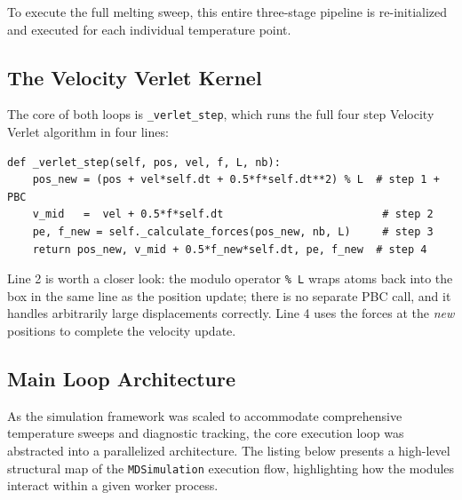 To execute the full melting sweep, this entire three-stage pipeline is re-initialized and executed for each individual temperature point.

\subsection{The Velocity Verlet Kernel}

The core of both loops is \texttt{\_verlet\_step}, which runs the full four step Velocity Verlet algorithm in four lines:

\begin{lstlisting}[caption={The integration kernel in \texttt{md\_engine.py}. All four lines implement Equations~\eqref{eq:vv_pos} to \eqref{eq:vv_vfull} directly. The \texttt{\% L} on line 2 applies the PBC wrap in the same operation as the position update.}, label={lst:vv_kernel}]
def _verlet_step(self, pos, vel, f, L, nb):
    pos_new = (pos + vel*self.dt + 0.5*f*self.dt**2) % L  # step 1 + PBC
    v_mid   =  vel + 0.5*f*self.dt                         # step 2
    pe, f_new = self._calculate_forces(pos_new, nb, L)     # step 3
    return pos_new, v_mid + 0.5*f_new*self.dt, pe, f_new  # step 4
\end{lstlisting}

Line 2 is worth a closer look: the modulo operator \texttt{\% L} wraps atoms back into the box in the same line as the position update; there is no separate PBC call, and it handles arbitrarily large displacements correctly. Line 4 uses the forces at the \emph{new} positions to complete the velocity update. 

\subsection{Main Loop Architecture}

As the simulation framework was scaled to accommodate comprehensive temperature sweeps and diagnostic tracking, the core execution loop was abstracted into a parallelized architecture. The listing below presents a high-level structural map of the \texttt{MDSimulation} execution flow, highlighting how the modules interact within a given worker process.

